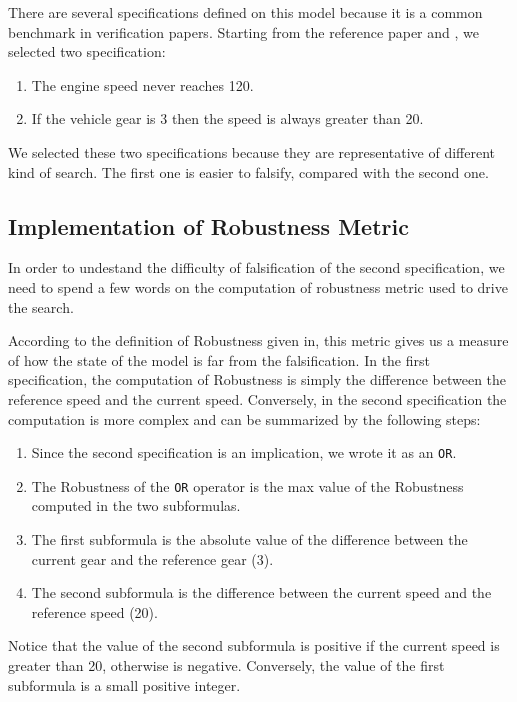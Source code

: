 \documentclass[11pt]{article}
\begin{document}
There are several specifications defined on this model because it is a common benchmark in verification papers. Starting from the reference paper and \cite{bardh2014benchmarks}, we selected two           specification:

\begin{enumerate}
    \item The engine speed never reaches 120.
    \item If the vehicle gear is 3 then the speed is always greater than 20.
\end{enumerate}

We selected these two specifications because they are representative of different kind of search. The first one is easier to falsify, compared with the second one.

\subsection{Implementation of Robustness Metric}
In order to undestand the difficulty of falsification of the second specification, we need to spend a few words on the computation of robustness metric used to drive the search.

According to the definition of Robustness given in\cite{fainekos2006robustness}, this metric gives us a measure of how the state of the model is far from the falsification. In the first specification,    the computation of Robustness is simply the difference between the reference speed and the current speed. Conversely, in the second specification the computation is more complex and can be summarized by  the following steps:

\begin{enumerate}
\item Since the second specification is an implication, we wrote it as an \texttt{OR}.
\item The Robustness of the \texttt{OR} operator is the max value of the Robustness computed in the two subformulas.
\item The first subformula is the absolute value of the difference between the current gear and the reference gear (3).
\item The second subformula is the difference between the current speed and the reference speed (20).
\end{enumerate}

Notice that the value of the second subformula is positive if the current speed is greater than 20, otherwise is negative. Conversely, the value of the first subformula is a small positive integer.
\end{document}
